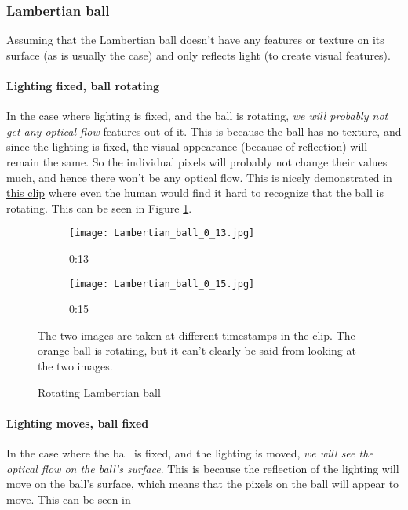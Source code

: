 \subsubsection{Lambertian ball}

Assuming that the Lambertian ball doesn't have any features or texture on its surface (as is usually the case) and only reflects light (to create visual features).

\paragraph*{Lighting fixed, ball rotating}

In the case where lighting is fixed, and the ball is rotating, \emph{we will probably not get any optical flow} features out of it. This is because the ball has no texture, and since the lighting is fixed, the visual appearance (because of reflection) will remain the same. So the individual pixels will probably not change their values much, and hence there won't be any optical flow. This is nicely demonstrated in \href{https://www.youtube.com/clip/UgkxbMT3LuFK5px5D2Uczx2lduW3QQW9_3YD}{this clip} where even the human would find it hard to recognize that the ball is rotating. This can be seen in Figure \ref{fig:q1-lambertian-ball}.

\begin{figure}[h]
    \centering
    \begin{subfigure}[b]{0.25\textwidth}
        \centering
        \texttt{[image: Lambertian\_ball\_0\_13.jpg]}
        \caption{0:13}
    \end{subfigure}
    \begin{subfigure}[b]{0.25\textwidth}
        \centering
        \texttt{[image: Lambertian\_ball\_0\_15.jpg]}
        \caption{0:15}
    \end{subfigure}
    \caption{Rotating Lambertian ball}
    \label{fig:q1-lambertian-ball}
    \small
        The two images are taken at different timestamps \href{https://www.youtube.com/clip/UgkxbMT3LuFK5px5D2Uczx2lduW3QQW9_3YD}{in the clip}. The orange ball is rotating, but it can't clearly be said from looking at the two images.
\end{figure}

\paragraph*{Lighting moves, ball fixed}

In the case where the ball is fixed, and the lighting is moved, \emph{we will see the optical flow on the ball's surface}. This is because the reflection of the lighting will move on the ball's surface, which means that the pixels on the ball will appear to move. This can be seen in 

